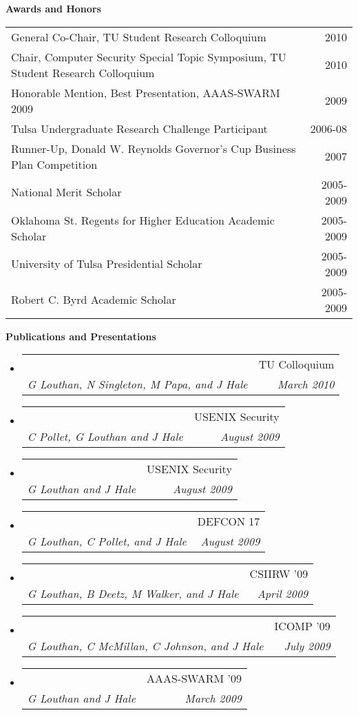 \documentclass[letterpaper,11pt]{article}
\makeatletter
\newcommand{\resheading}[1]{{\large \colorbox{mygrey}{\begin{minipage}{\textwidth}{\textbf{#1 \vphantom{p\^{E}}}}\end{minipage}}}}
\newcommand{\ressubheading}[4]{
\begin{tabular*}{6.5in}{l@{\extracolsep{\fill}}r}
		\textbf{\parbox{5in}{\raggedright #1 }} & #2 \\
		\textit{#3} & \textit{#4} \\
\end{tabular*}\vspace{-6pt}}
\makeatother
\begin{document}
\resheading{Awards and Honors}
\begin{center}
	\begin{tabular*}{6.5in}{l@{\extracolsep{\fill}}r}
		General Co-Chair, TU Student Research Colloquium & 2010 \\
		Chair, Computer Security Special Topic Symposium, TU Student Research Colloquium & 2010 \\
		Honorable Mention, Best Presentation, AAAS-SWARM 2009 & 2009 \\
		Tulsa Undergraduate Research Challenge Participant & 2006-08\\
		Runner-Up, Donald W. Reynolds Governor's Cup Business Plan Competition & 2007\\
		National Merit Scholar & 2005-2009\\
		Oklahoma St. Regents for Higher Education Academic Scholar & 2005-2009\\
		University of Tulsa Presidential Scholar & 2005-2009\\
		Robert C. Byrd Academic Scholar & 2005-2009\\
	\end{tabular*}
\end{center}

\resheading{Publications and Presentations}
\begin{itemize}
\item
	\ressubheading{\emph{Towards Formal Analysis of Cyber-Physical Systems}}{TU Colloquium}{G Louthan, N Singleton, M Papa, and J Hale}{March 2010}
\item
	\ressubheading{\emph{Large-scale Multitouch Interactive Network Visualization} (Poster)}{USENIX Security}{C Pollet, G Louthan and J Hale}{August 2009}
\item
	\ressubheading{\emph{SAND: An Architecture for Signature-based Automatic Network Protocol Detection} (Poster)}{USENIX Security}{G Louthan and J Hale}{August 2009}
\item
	\ressubheading{\emph{Hack Like the Movie Stars: A Big-Screen Multitouch Network Monitor}}{DEFCON 17}{G Louthan, C Pollet, and J Hale}{August 2009}
\item
	\ressubheading{\emph{Content-based Alternatives to Conventional Network Monitoring}\footnotemark[1]}{CSIIRW '09}{G Louthan, B Deetz, M Walker, and J Hale}{April 2009}
\item
	\ressubheading{\emph{Toward Robust and Extensible Network Protocol Identification}\footnotemark[1]}{ICOMP '09}{G Louthan, C McMillan, C Johnson, and J Hale}{July 2009}
\item
	\ressubheading{\emph{Communication without Boundaries: Breaching the Great Firewall of China}}{AAAS-SWARM '09}{G Louthan and J Hale}{March 2009}
\end{itemize}
\end{document}
